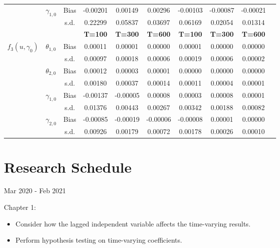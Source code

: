 \documentclass[12pt,a4paper]{article}
\begin{document}
\begin{table}[htbp]
\begin{adjustbox}{max width=0.95\textwidth}
\begin{tabular}{clcccccccc}
				& \multirow{2}[0]{*}{$\gamma_{1,0}$} & Bias & -0.00201 & 0.00149 & 0.00296 & -0.00103 & -0.00087 & -0.00021 \\
				&   & s.d. & 0.22299 & 0.05837 & 0.03697 & 0.06169 & 0.02054 & 0.01314 \\
				\hline
				&   &   & \textbf{T=100} & \textbf{T=300} & \textbf{T=600} & \textbf{T=100} & \textbf{T=300} & \textbf{T=600} \\
				\hline
				\multirow{8}[0]{*}{$f_3(u,\gamma_{0})$} & \multirow{2}[0]{*}{$\theta_{1,0}$} & Bias & 0.00011 & 0.00001 & 0.00000 & 0.00001 & 0.00000 & 0.00000 \\
				&   & s.d. & 0.00097 & 0.00018 & 0.00006 & 0.00019 & 0.00006 & 0.00002 \\
				& \multirow{2}[0]{*}{$\theta_{2,0}$} & Bias & 0.00012 & 0.00003 & 0.00001 & 0.00000 & 0.00000 & 0.00000 \\
				&   & s.d. & 0.00180 & 0.00037 & 0.00014 & 0.00011 & 0.00004 & 0.00001 \\
				& \multirow{2}[0]{*}{$\gamma_{1,0}$} & Bias & -0.00137 & -0.00005 & 0.00008 & 0.00003 & 0.00008 & 0.00001 \\
				&   & s.d. & 0.01376 & 0.00443 & 0.00267 & 0.00342 & 0.00188 & 0.00082 \\
				& \multirow{2}[0]{*}{$\gamma_{2,0}$} & Bias & -0.00085 & -0.00019 & -0.00006 & -0.00008 & 0.00001 & 0.00000 \\
				&   & s.d. & 0.00926 & 0.00179 & 0.00072 & 0.00178 & 0.00026 & 0.00010 \\
				\hline \hline
			\end{tabular}%
		\end{adjustbox}
	\end{table}%
	
	\pagebreak
	
	
	\section*{Research Schedule}
\noindent Mar 2020 - Feb 2021

Chapter 1:
\begin{itemize}
	\item Consider how the lagged independent variable affects the time-varying results. 
	
	\item Perform hypothesis testing on time-varying coefficients.
	
\end{itemize}

%	
\end{document}
